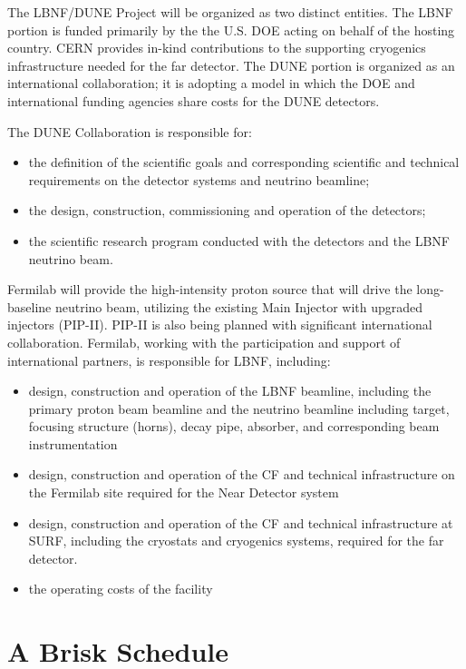 The LBNF/DUNE Project will be organized as two distinct entities. The LBNF portion is funded primarily
by the the U.S. DOE acting on behalf of the hosting country.  CERN provides in-kind contributions to the supporting cryogenics infrastructure needed for the far detector. The DUNE portion is organized
as an international collaboration; it is adopting a model in which the DOE and international funding agencies share costs %
for the DUNE detectors.

The DUNE Collaboration is responsible for:
\begin{itemize}
\item the definition of the scientific goals and corresponding scientific and technical requirements on the detector systems and neutrino beamline;
\item the design, construction, commissioning and operation of the detectors;
\item the scientific research program conducted with the detectors and the LBNF neutrino beam.
\end{itemize}

Fermilab will provide the high-intensity proton source that will drive the long-baseline neutrino beam, utilizing the existing Main Injector with upgraded injectors (PIP-II).  PIP-II is also being planned with significant international collaboration.  Fermilab, working %
with the participation and support of international partners, is responsible for %
LBNF, including:
\begin{itemize}
\item design, construction and operation of the LBNF beamline, including the primary proton beam beamline and the neutrino beamline including target, focusing structure (horns), decay pipe, absorber, and corresponding beam instrumentation
\item design, construction and operation of the CF and technical infrastructure on the Fermilab site required for the Near Detector system
\item design, construction and operation of the CF and technical infrastructure %
at SURF, including the cryostats and cryogenics systems, required for the far detector.
\item %
the operating costs of the facility
\end{itemize}


\section{A Brisk Schedule} %

